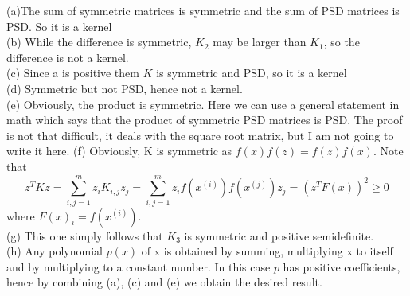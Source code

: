 \begin{answer}
(a)The sum of symmetric matrices is symmetric and the sum of PSD matrices is PSD. So it is a kernel\\

(b) While the difference is symmetric, $K_2$ may be larger than $K_1$, so the difference is not a kernel.\\
(c) Since a is positive them $K$ is symmetric and PSD, so it is a kernel\\
(d) Symmetric but not PSD, hence not a kernel.\\
(e) Obviously, the product is symmetric. Here we can use a general statement in math
which says that the product of symmetric PSD matrices is PSD. The proof is not that difficult, it deals
with the square root matrix, but I am not going to write it here.
(f) Obviously, K is symmetric as $f(x)f(z) = f(z)f(x)$. Note that 
$$z^TKz = \sum\limits_{i,j = 1}^m z_i K_{i,j}z_j = \sum\limits_{i,j = 1}^m z_i f(x^{(i)})f(x^{(j)})z_j =  (z^TF(x))^2 \ge 0$$
where $F(x)_i = f(x^{(i)}).$\\
(g) This one simply follows that $K_3$ is symmetric and positive semidefinite.\\

(h) Any polynomial $p(x)$ of x is obtained by summing, multiplying x to itself and by multiplying to a constant number.
In this case $p$ has positive coefficients, hence by combining (a), (c) and (e) we obtain the desired result.
\end{answer}